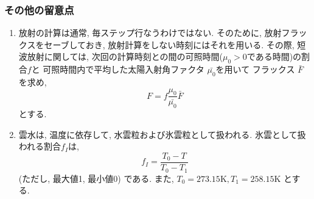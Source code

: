 \subsubsection{その他の留意点}

\begin{enumerate}
\item 放射の計算は通常, 毎ステップ行なうわけではない.
      そのために, 放射フラックスをセーブしておき, 
      放射計算をしない時刻にはそれを用いる.
      その際, 短波放射に関しては,
      次回の計算時刻との間の可照時間($\mu_0>0$である時間)の割合$f$と
      可照時間内で平均した太陽入射角ファクタ $\bar{\mu_0}$を用いて
      フラックス $\bar{F}$ を求め,
      \begin{equation}
        F =  f \frac{\mu_0}{\bar{\mu_0}} \bar{F}
      \end{equation}
      とする.


\item 雲水は, 温度に依存して, 
      水雲粒および氷雲粒として扱われる.
      氷雲として扱われる割合$f_I$は,
      \begin{equation}
        f_I = \frac{ T_0 - T }{ T_0 - T_1 }
      \end{equation}
      (ただし, 最大値1, 最小値0) である. また,
      $T_0 = 273.15\mbox{K}, T_1 = 258.15\mbox{K}$ とする.

\end{enumerate}




